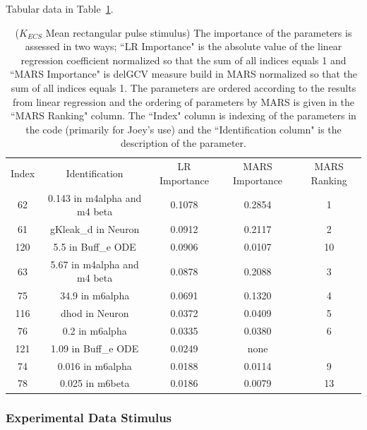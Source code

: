\documentclass[12pt]{article}
\numberwithin{equation}{section}
\begin{document}
Tabular data in Table~\ref{qoi_K_ECS_Mean_rec}.

\begin{table}[h]
\centering
\begin{tabular}{ccccc}
Index & Identification & LR Importance & MARS Importance & MARS Ranking \\
62 & 0.143 in m4alpha and m4 beta &  0.1078 & 0.2854 & 1\\
61 & gKleak\_d in Neuron & 0.0912 & 0.2117 & 2\\
120 & 5.5 in Buff\_e ODE & 0.0906 & 0.0107 & 10\\
63 &   5.67 in m4alpha and m4 beta & 0.0878 & 0.2088 & 3\\
75 & 34.9 in m6alpha & 0.0691 & 0.1320 & 4\\
116 & dhod in Neuron & 0.0372 & 0.0409 & 5\\
76 & 0.2 in m6alpha & 0.0335 & 0.0380 & 6\\
121 & 1.09 in Buff\_e ODE & 0.0249 & none & \\
74 & 0.016 in m6alpha & 0.0188 & 0.0114 & 9\\
78 & 0.025 in m6beta & 0.0186 & 0.0079 & 13\\
\end{tabular}
\caption{($K_{ECS}$ Mean rectangular pulse stimulus) The importance of the parameters is assessed in two ways; ``LR Importance" is the absolute value of the linear regression coefficient normalized so that the sum of all indices equals 1 and ``MARS Importance" is delGCV measure build in MARS normalized so that the sum of all indices equals 1. The parameters are ordered according to the results from linear regression and the ordering of parameters by MARS is given in the ``MARS Ranking" column. The ``Index" column is indexing of the parameters in the code (primarily for Joey's use) and the ``Identification column" is the description of the parameter.}
\label{qoi_K_ECS_Mean_rec}
\end{table}

\newpage

\subsubsection{Experimental Data Stimulus}
\end{document}
